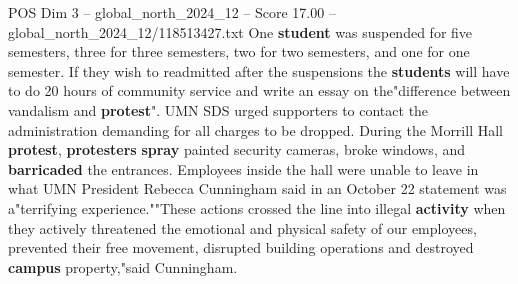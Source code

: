 \begin{textsample}{POS Dim 3 – global\_north\_2024\_12 – Score 17.00 – global\_north\_2024\_12/118513427.txt}
One \textbf{student} was suspended for five semesters, three for three semesters, two for two semesters, and one for one semester.
If they wish to readmitted after the suspensions the \textbf{students} will have to do 20 hours of community service and write an essay on the"difference between vandalism and \textbf{protest}".
UMN SDS urged supporters to contact the administration demanding for all charges to be dropped.
During the Morrill Hall \textbf{protest}, \textbf{protesters} \textbf{spray} painted security cameras, broke windows, and \textbf{barricaded} the entrances.
Employees inside the hall were unable to leave in what UMN President Rebecca Cunningham said in an October 22 statement was a"terrifying experience.""These actions crossed the line into illegal \textbf{activity} when they actively threatened the emotional and physical safety of our employees, prevented their free movement, disrupted building operations and destroyed \textbf{campus} property,"said Cunningham.

\end{textsample}
